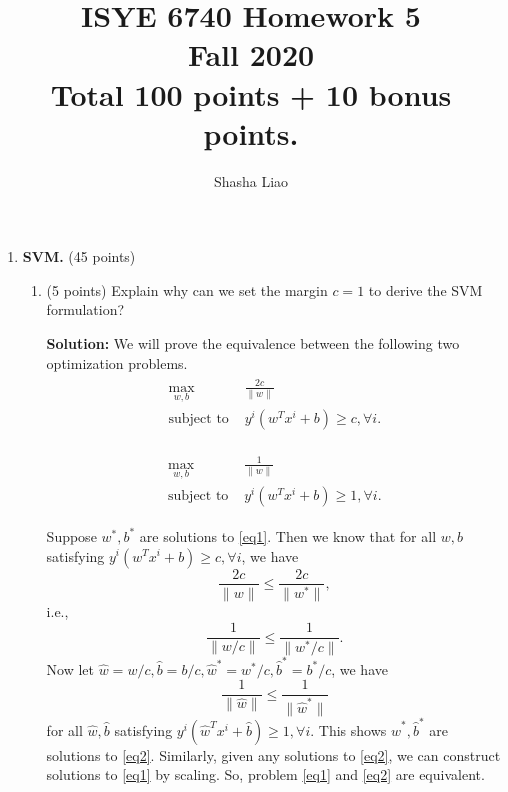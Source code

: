 \documentclass[twoside,10pt]{article}
\begin{document}
\title{ISYE 6740 Homework 5\\ 
Fall 2020\\
\small Total 100 points + 10 bonus points.}
\author{Shasha Liao}
\date{}
\maketitle







\begin{enumerate}


\item{\bf SVM. } (45 points)

\begin{enumerate}
\item (5 points) Explain why can we set the margin $c = 1$ to derive the SVM formulation?
\begin{tcolorbox}
\textbf{Solution:} We will prove the equivalence between the following two optimization problems.
\begin{align}\label{eq1}
\begin{split}
\max_{w,b} & \frac{2c}{\|w\|}\\
\text{subject to } & y^i(w^Tx^i + b) \geq c, \forall i.
\end{split}
\end{align}

\begin{align}\label{eq2}
\begin{split}
\max_{w,b} & \frac{1}{\|w\|}\\
\text{subject to } & y^i(w^Tx^i + b) \geq 1, \forall i.
\end{split}
\end{align}

Suppose $w^*, b^*$ are solutions to \eqref{eq1}.
Then we know that for all $w, b$ satisfying $ y^i(w^Tx^i + b) \geq c, \forall i$, we have $$\frac{2c}{\|w\|} \leq \frac{2c}{\|w^*\|},$$ i.e., $$\frac{1}{\|w/c\|} \leq \frac{1}{\|w^*/c\|}.$$ Now let $\hat{w} = w/c, \hat{b} = b/c, \hat{w}^* = w^*/c, \hat{b}^* = b^*/c$, we have 
$$\frac{1}{\|\hat{w}\|} \leq \frac{1}{\|\hat{w}^*\|}$$ for all $\hat{w}, \hat{b}$ satisfying $y^i(\hat{w}^Tx^i + \hat{b}) \geq 1, \forall i$. 
This shows $\hat{w}^*, \hat{b}^* $ are solutions to \eqref{eq2}. Similarly, given any solutions to \eqref{eq2}, we can construct solutions to \eqref{eq1} by scaling. So, problem \eqref{eq1} and \eqref{eq2} are equivalent. 
\end{tcolorbox}


\end{enumerate}
\end{enumerate}
\end{document}
